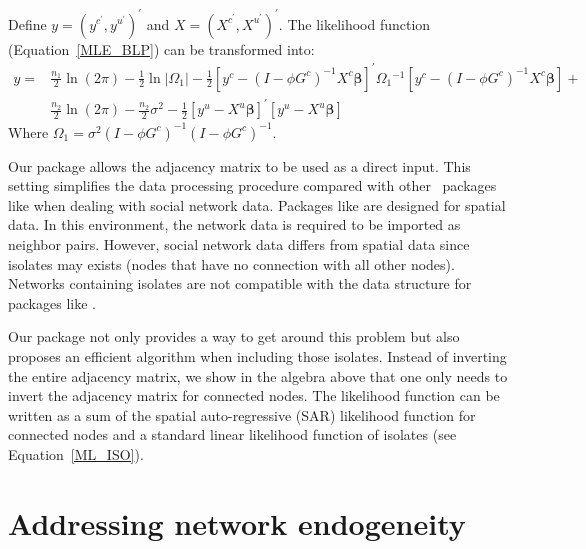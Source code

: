 \documentclass[nojss]{jss}
\begin{document}
%
Define $y=\left( y^{c^{\prime }},y^{u^{\prime }}\right) ^{\prime }$ and
$X=\left( X^{c^{\prime }},X^{u^{\prime }}\right) ^{\prime }$.  The
likelihood function (Equation~\ref{MLE_BLP}) can be transformed into:
%
\begin{equation}
\begin{split}
y = &\frac{n_{1}}{2}\ln \left( 2\pi \right) -\frac{1}{2}\ln \lvert\Omega
_{1}\rvert-\frac{1}{2}\left[ y^{c}-(I-\phi G^{c})^{-1}X^{c}\mathbf{\beta }
\right] ^{\prime}\Omega _{1}{}^{-1}\left[y^{c}-(I-\phi G^{c})^{-1}X^{c}
\mathbf{\beta }\right] + \\
& \frac{n_{2}}{2}\ln \left( 2\pi \right) - \frac{n_{2}}{2}\sigma
^{2}-\frac{1}{2}\left[ y^{u}-X^{u}\mathbf{\beta}\right] ^{\prime }\left[
y^{u}-X^{u}\mathbf{\beta}\right]
\label{ML_ISO}
\end{split}
\end{equation}
%
Where $\Omega _{1}=\sigma ^{2}(I-\phi G^{c})^{-1}(I-\phi G^{c})^{-1}$.

Our package allows the adjacency matrix to be used as a direct input.  This
setting simplifies the data processing procedure compared with other
~packages like  when dealing with social network data.  Packages
like  are designed for spatial data.  In this environment, the
network data is required to be imported as neighbor pairs.  However, social
network data differs from spatial data since isolates may exists (nodes that
have no connection with all other nodes).  Networks containing isolates are
not compatible with the data structure for packages like .

Our package not only provides a way to get around this problem but also
proposes an efficient algorithm when including those isolates.  Instead of
inverting the entire adjacency matrix, we show in the algebra above that one
only needs to invert the adjacency matrix for connected nodes.  The
likelihood function can be written as a sum of the spatial auto-regressive
(SAR) likelihood function for connected nodes and a standard linear
likelihood function of isolates (see Equation~\ref{ML_ISO}).

\section{Addressing network endogeneity} \label{sec:endogeneity}
\end{document}
